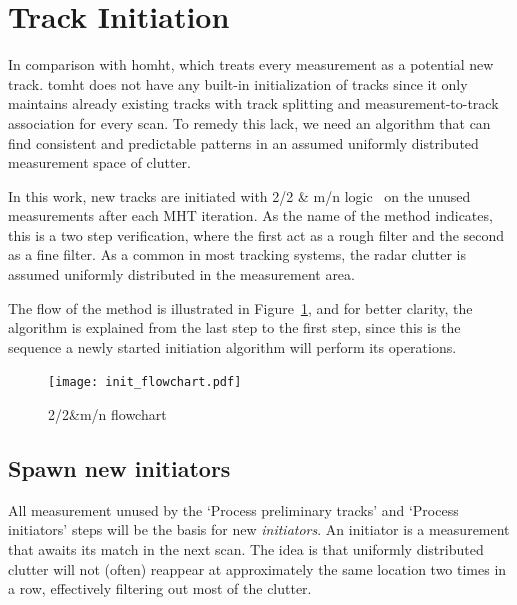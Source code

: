 \section{Track Initiation}
In comparison with \gls{homht}, which treats every measurement as a potential new track. \Gls{tomht} does not have any built-in initialization of tracks since it only maintains already existing tracks with track splitting and measurement-to-track association for every scan. To remedy this lack, we need an algorithm that can find consistent and predictable patterns in an assumed uniformly distributed measurement space of clutter. 

In this work, new tracks are initiated with 2/2 \& m/n logic~\cite{Vo2015} on the unused measurements after each MHT iteration. As the name of the method indicates, this is a two step verification, where the first act as a rough filter and the second as a fine filter. As a common in most tracking systems, the radar clutter is assumed uniformly distributed in the measurement area. 

The flow of the method is illustrated in Figure~\ref{fig:init_flowchart}, and for better clarity, the algorithm is explained from the last step to the first step, since this is the sequence a newly started initiation algorithm will perform its operations.
\begin{figure}[H]
\centering
\texttt{[image: init\_flowchart.pdf]}
\caption{2/2\&m/n flowchart}\label{fig:init_flowchart}
\end{figure}

\subsection{Spawn new initiators}
All measurement unused by the `Process preliminary tracks' and `Process initiators' steps will be the basis for new \emph{initiators}. An initiator is a measurement that awaits its match in the next scan. The idea is that uniformly distributed clutter will not (often) reappear at approximately the same location two times in a row, effectively filtering out most of the clutter.

